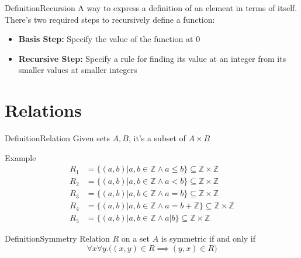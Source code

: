 \documentclass{MathNotes}
\newenvironment{example}[1]{\begin{BlueBox}{Example}{#1}}{\end{BlueBox}}
\newenvironment{definition}[1]{\begin{RedBox}{Definition}{#1}}{\end{RedBox}}
\begin{document}
\begin{definition}{Recursion}
    A way to express a definition of an element in terms of itself. There's
    two required steps to recursively define a function:
    \begin{itemize}
        \item \textbf{Basis Step:} Specify the value of the function at 0
        \item \textbf{Recursive Step:} Specify a rule for finding its value at
            an integer from its smaller values at smaller integers
    \end{itemize}
\end{definition}

\section{Relations}
\begin{definition}{Relation}
	Given sets $A,B$, it's a subset of $A\times B$
\end{definition}

\begin{example}{}
	\begin{align*}
		R_1 & = \{(a,b)|a,b\in\mathbb{Z}\land a\leq b\}\subseteq\mathbb{Z}\times\mathbb{Z}        \\
		R_2 & = \{(a,b)|a,b\in\mathbb{Z}\land a<b\}\subseteq\mathbb{Z}\times\mathbb{Z}            \\
		R_3 & = \{(a,b)|a,b\in\mathbb{Z}\land a=b\}\subseteq\mathbb{Z}\times\mathbb{Z}            \\
		R_4 & = \{(a,b)|a,b\in\mathbb{Z}\land a=b+\mathbb{Z}\}\subseteq\mathbb{Z}\times\mathbb{Z} \\
		R_5 & = \{(a,b)|a,b\in\mathbb{Z}\land a|b\}\subseteq\mathbb{Z}\times\mathbb{Z}
	\end{align*}
\end{example}

\begin{definition}{Symmetry}
	Relation $R$ on a set $A$ is symmetric if and only if
	\[\forall x\forall y.\big((x,y)\in R\implies(y,x)\in R\big)\]
\end{definition}
\end{document}
